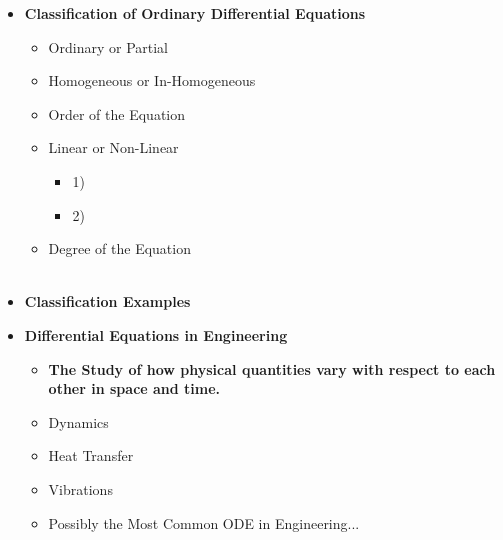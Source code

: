 \documentclass[11pt]{article}
\newcommand{\VSPC}{15mm}
\begin{document}
\begin{itemize}
\newpage
\item \textbf{\LARGE Classification of Ordinary Differential Equations} \\
	\begin{itemize}
		\item Ordinary or Partial\vspace{\VSPC} \\
		\item Homogeneous or In-Homogeneous\vspace{\VSPC} \\
		\item Order of the Equation\vspace{\VSPC} \\
		\item Linear or Non-Linear \vspace{\VSPC} 
		\begin{itemize}
			\item 1)\\
			\item 2)\vspace{\VSPC} \\
		\end{itemize}
		\item Degree of the Equation\\ \\
		
	\end{itemize}

\newpage
\item \textbf{\LARGE Classification Examples}


\newpage
\item \textbf{\LARGE Differential Equations in Engineering}

	\begin{itemize}

		\item \textbf{ \LARGE The Study of how physical quantities vary with respect to each other in space and time.}\\
		\item Dynamics \\
		\item Heat Transfer\\
		\item Vibrations\\
		\item Possibly the Most Common ODE in Engineering...\\
	
		
			


\end{itemize}
\end{itemize}
\end{document}
